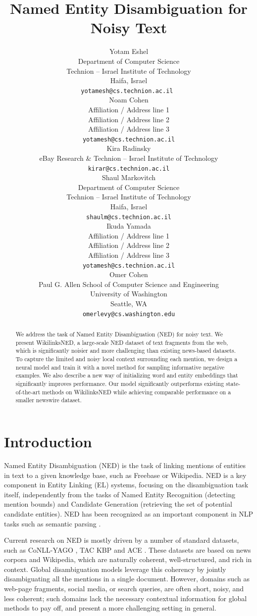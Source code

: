 \documentclass[11pt,a4paper]{article}
\title{Named Entity Disambiguation for Noisy Text}
\author{Yotam Eshel \\
	Department of Computer Science \\
	Technion – Israel Institute of Technology \\
	Haifa, Israel \\
	{\tt yotamesh@cs.technion.ac.il  } \\
	\And
	Noam Cohen \\
	Affiliation / Address line 1 \\ 
	Affiliation / Address line 2 \\
	Affiliation / Address line 3 \\ 
	{\tt yotamesh@cs.technion.ac.il} \\
	\And
	Kira Radinsky \\
	eBay Research \& Technion  – Israel Institute of Technology \\ 
	{\tt kirar@cs.technion.ac.il} \\
	\And
	Shaul Markovitch \\
	Department of Computer Science \\
	Technion – Israel Institute of Technology \\
	Haifa, Israel \\
	{\tt shaulm@cs.technion.ac.il} \\
	\And
	Ikuda Yamada \\
	Affiliation / Address line 1 \\ 
	Affiliation / Address line 2 \\
	Affiliation / Address line 3 \\
	{\tt yotamesh@cs.technion.ac.il} \\
	\And
	Omer Cohen \\
	Paul G. Allen School of Computer Science and Engineering \\
	University of Washington \\ 
	Seattle, WA \\
	{\tt omerlevy@cs.washington.edu} \\}
\date{}
\begin{document}
	\maketitle
	\begin{abstract}
		We address the task of Named Entity Disambiguation (NED) for noisy text. 
		We present WikilinksNED, a large-scale NED dataset of text fragments from the web, which is significantly noisier and more challenging than existing news-based datasets.
		To capture the limited and noisy local context surrounding each mention, we design a neural model and train it with a novel method for sampling informative negative examples. We also describe a new way of initializing word and entity embeddings that significantly improves performance.
		Our model significantly outperforms existing state-of-the-art methods on WikilinksNED while achieving comparable performance on a smaller newswire dataset.
	\end{abstract}
	
	
	
	\section{Introduction}
			
	Named Entity Disambiguation (NED) is the task of linking mentions of entities in text to a given knowledge base, such as Freebase or Wikipedia. 
	NED is a key component in Entity Linking (EL) systems, focusing on the disambiguation task itself, independently from the tasks of Named Entity Recognition (detecting mention bounds) and Candidate Generation (retrieving the set of potential candidate entities). NED has been recognized as an important component in NLP tasks such as semantic parsing \cite{berant2013semantic}.
		
	Current research on NED is mostly driven by a number of standard datasets, such as CoNLL-YAGO \cite{hoffart2011robust}, TAC KBP \cite{ji2010overview} and ACE \cite{bentivogli2010extending}. These datasets are based on news corpora and Wikipedia, which are naturally coherent, well-structured, and rich in context. Global disambiguation models \cite{guo2014entity,pershina2015personalized,Globerson2016} leverage this coherency by jointly disambiguating all the mentions in a single document. However, domains such as web-page fragments, social media, or search queries, are often short, noisy, and less coherent; such domains lack the necessary contextual information for global methods to pay off, and present a more challenging setting in general.
\end{document}
